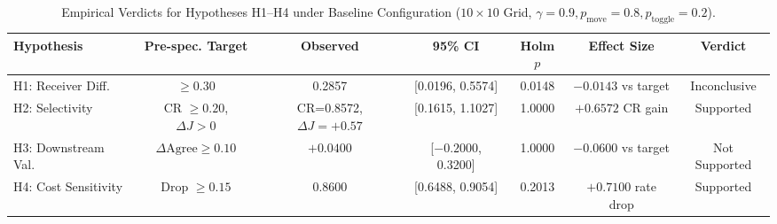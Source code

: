 \begin{table}[t]
\centering
\small
\caption{Empirical Verdicts for Hypotheses H1--H4 under Baseline Configuration ($10\times 10$ Grid, $\gamma=0.9, p_{\mathrm{move}}=0.8, p_{\mathrm{toggle}}=0.2$).}
\label{tab:hypothesis_summary}
\begin{tabular}{lcccccc}
\toprule
Hypothesis & Pre-spec. Target & Observed & 95\% CI & Holm $p$ & Effect Size & Verdict \\
\midrule
H1: Receiver Diff. & $\ge 0.30$ & 0.2857 & [0.0196, 0.5574] & 0.0148 & $-0.0143$ vs target & Inconclusive \\
H2: Selectivity & CR $\ge 0.20$, $\Delta J > 0$ & CR=0.8572, $\Delta J=+0.57$ & [0.1615, 1.1027] & 1.0000 & $+0.6572$ CR gain & Supported \\
H3: Downstream Val. & $\Delta \mathrm{Agree} \ge 0.10$ & $+0.0400$ & [$-0.2000$, 0.3200] & 1.0000 & $-0.0600$ vs target & Not Supported \\
H4: Cost Sensitivity & Drop $\ge 0.15$ & 0.8600 & [0.6488, 0.9054] & 0.2013 & $+0.7100$ rate drop & Supported \\
\bottomrule
\end{tabular}
\end{table}
